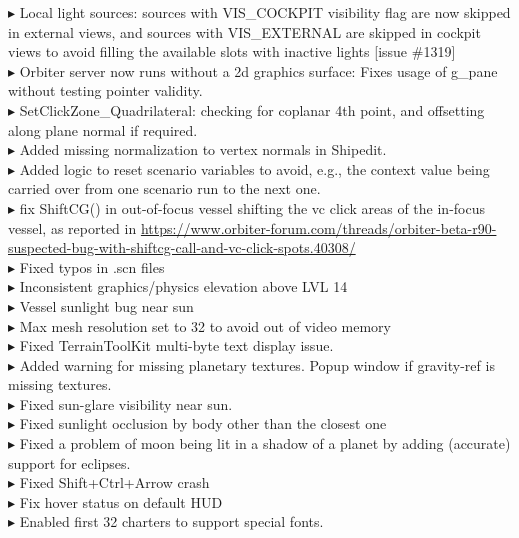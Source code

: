 \documentclass[Orbiter User Manual.tex]{subfiles}
\begin{document}
$\blacktriangleright$ Local light sources: sources with VIS\_COCKPIT visibility flag are now skipped in external views, and sources with VIS\_EXTERNAL are skipped in cockpit views to avoid filling the available slots with inactive lights [issue \#1319]\\
$\blacktriangleright$ Orbiter server now runs without a 2d graphics surface: Fixes usage of g\_pane without testing pointer validity.\\
$\blacktriangleright$ SetClickZone\_Quadrilateral: checking for coplanar 4th point, and offsetting along plane normal if required.\\
$\blacktriangleright$ Added missing normalization to vertex normals in Shipedit.\\
$\blacktriangleright$ Added logic to reset scenario variables to avoid, e.g., the context value being carried over from one scenario run to the next one.\\
$\blacktriangleright$ fix ShiftCG() in out-of-focus vessel shifting the vc click areas of the in-focus vessel, as reported in \url{https://www.orbiter-forum.com/threads/orbiter-beta-r90-suspected-bug-with-shiftcg-call-and-vc-click-spots.40308/}\\
$\blacktriangleright$ Fixed typos in .scn files\\
$\blacktriangleright$ Inconsistent graphics/physics elevation above LVL 14\\
$\blacktriangleright$ Vessel sunlight bug near sun\\
$\blacktriangleright$ Max mesh resolution set to 32 to avoid out of video memory\\
$\blacktriangleright$ Fixed TerrainToolKit multi-byte text display issue.\\
$\blacktriangleright$ Added warning for missing planetary textures. Popup window if gravity-ref is missing textures.\\
$\blacktriangleright$ Fixed sun-glare visibility near sun.\\
$\blacktriangleright$ Fixed sunlight occlusion by body other than the closest one\\
$\blacktriangleright$ Fixed a problem of moon being lit in a shadow of a planet by adding (accurate) support for eclipses.\\
$\blacktriangleright$ Fixed Shift+Ctrl+Arrow crash\\
$\blacktriangleright$ Fix hover status on default HUD\\
$\blacktriangleright$ Enabled first 32 charters to support special fonts.\\
\end{document}
